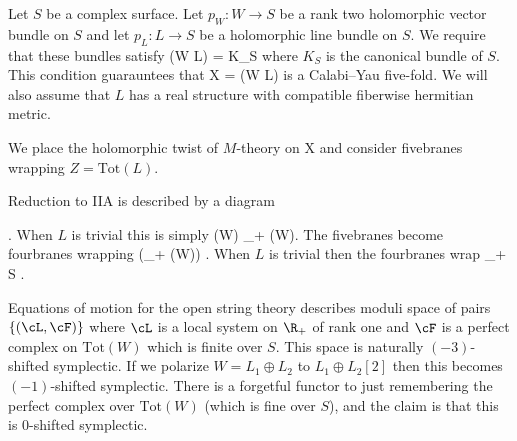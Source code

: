 Let $S$ be a complex surface.
Let $p_W \colon W \to S$ be a rank two holomorphic vector bundle on $S$ and let $p_L \colon L \to S$ be a holomorphic line bundle on $S$.
We require that these bundles satisfy
\beqn
\det (W \oplus L) = K_S 
\eeqn
where $K_S$ is the canonical bundle of $S$.
This condition guarauntees that
\beqn
X = (W \oplus L)
\eeqn
is a Calabi--Yau five-fold.
We will also assume that $L$ has a real structure with compatible fiberwise hermitian metric.

We place the holomorphic twist of $M$-theory on 
\beqn
\R \times X
\eeqn
and consider fivebranes wrapping $Z = \text{Tot}(L)$.

Reduction to IIA is described by a diagram
\beqn
{} .
\eeqn
When $L$ is trivial this is simply
\beqn
\R \times \C \to {}(W) \to \R \times \R_+ \times {}(W).
\eeqn
The fivebranes become fourbranes wrapping
\beqn
{}(\R_+ \to {}(W)) .
\eeqn
When $L$ is trivial then the fourbranes wrap
 \times \R_+ \times S .
\eeqn

Equations of motion for the open string theory describes moduli space of pairs $\{(\cL, \cF)\}$ where $\cL$ is a local system on $\R_+$ of rank one and $\cF$ is a perfect complex on $\text{Tot}(W)$ which is finite over $S$.
This space is naturally $(-3)$-shifted symplectic.
If we polarize $W = L_1 \oplus L_2$ to $L_1 \oplus L_2[2]$ then this becomes $(-1)$-shifted symplectic.
There is a forgetful functor to just remembering the perfect complex over $\text{Tot}(W)$ (which is fine over $S$), and the claim is that this is $0$-shifted symplectic.